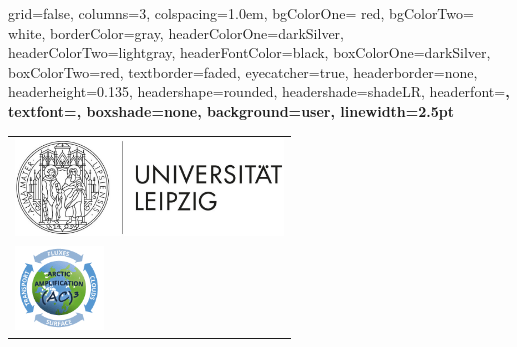 \documentclass[portrate,a0paper,fontscale=0.45,margin=1cm]{baposter}
\begin{document}
\begin{poster}%
  {
  grid=false, %
  columns=3,
  colspacing=1.0em,
  bgColorOne= red, %
  bgColorTwo= white, %
  borderColor=gray, %
  headerColorOne=darkSilver, %
  headerColorTwo=lightgray, 
  headerFontColor=black, %
  boxColorOne=darkSilver, %
  boxColorTwo=red, %
  textborder=faded,
  eyecatcher=true,
  headerborder=none, %
  headerheight=0.135\textheight,
  headershape=rounded, %
  headershade=shadeLR,
  headerfont=\LARGE\bf,  %
  textfont={\color{black}\setlength{\parindent}{1.5em}},
  boxshade=none, %
  background=user, %
  linewidth=2.5pt
  }
  {
  	\begin{tabular}{l}
      \includegraphics[height=7.0em]{uni_leipzig-logo.jpg}\\
      \vspace{+3em}
      \includegraphics[height=6.0em]{logo_small-ac3.png}
      

\end{tabular}}
\end{poster}
\end{document}
